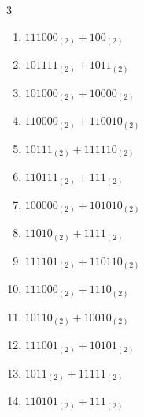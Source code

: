 \begin{multicols}{3}
\begin{enumerate}
  \item $111000_{(2)} + 100_{(2)}$


  \item $101111_{(2)} + 1011_{(2)}$


  \item $101000_{(2)} + 10000_{(2)}$


  \item $110000_{(2)} + 110010_{(2)}$


  \item $10111_{(2)} + 111110_{(2)}$


  \item $110111_{(2)} + 111_{(2)}$


  \item $100000_{(2)} + 101010_{(2)}$


\columnbreak %

  \item $11010_{(2)} + 1111_{(2)}$


  \item $111101_{(2)} + 110110_{(2)}$


  \item $111000_{(2)} + 1110_{(2)}$


  \item $10110_{(2)} + 10010_{(2)}$


  \item $111001_{(2)} + 10101_{(2)}$


  \item $1011_{(2)} + 11111_{(2)}$


  \item $110101_{(2)} + 111_{(2)}$


\end{enumerate}
\end{multicols}

